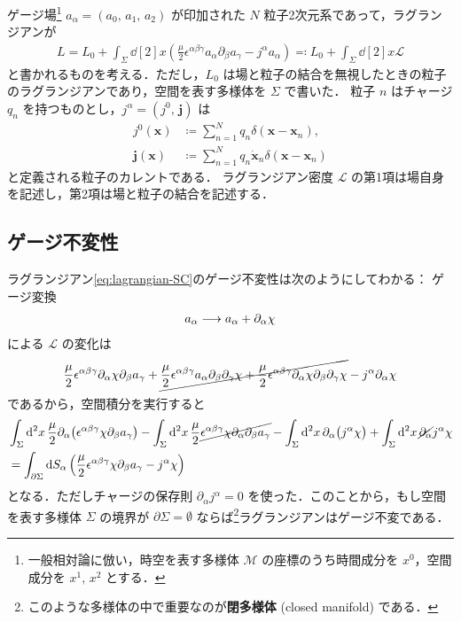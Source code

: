 \documentclass[TQFT_main]{subfiles}
\begin{document}
ゲージ場\footnote{一般相対論に倣い，時空を表す多様体 $\mathcal{M}$ の座標のうち時間成分を $x^0$，空間成分を $x^1,\, x^2$ とする．} $a_\alpha = (a_0,\, a_1,\, a_2)$ が印加された $N$ 粒子2次元系であって，ラグランジアンが
\begin{align}
    \label{eq:lagrangian-SC}
    L = L_0 + \int_\Sigma \dd[2]{x} \left( \frac{\mu}{2} \epsilon^{\alpha\beta\gamma} a_{\alpha} \partial_\beta a_\gamma -  j^\alpha a_\alpha \right) \eqqcolon L_0 + \int_{\Sigma} \dd[2]{x} \mathcal{L}
\end{align}
と書かれるものを考える．ただし，$L_0$ は場と粒子の結合を無視したときの粒子のラグランジアンであり，空間を表す多様体を $\Sigma$ で書いた．
粒子 $n$ はチャージ $q_n$ を持つものとし，$j^\alpha = (j^0,\, \bm{j})$ は
\begin{align}
    j^0(\bm{x}) &\coloneqq \sum_{n = 1}^N q_n \delta (\bm{x} - \bm{x}_n), \\
    \bm{j}(\bm{x}) &\coloneqq \sum_{n = 1}^N q_n \dot{\bm{x}}_n\delta (\bm{x} - \bm{x}_n)
\end{align}
と定義される粒子のカレントである．
ラグランジアン密度 $\mathcal{L}$ の第1項は場自身を記述し，第2項は場と粒子の結合を記述する．

\subsection{ゲージ不変性}

ラグランジアン\eqref{eq:lagrangian-SC}のゲージ不変性は次のようにしてわかる：
ゲージ変換
\begin{align}
    a_\alpha \longrightarrow a_\alpha + \partial_\alpha \chi
\end{align}
による $\mathcal{L}$ の変化は
\begin{align}
    \frac{\mu}{2} \epsilon^{\alpha\beta\gamma} \partial_{\alpha}\chi \partial_\beta a_\gamma + \cancel{\frac{\mu}{2} \epsilon^{\alpha\beta\gamma} a_\alpha\partial_\beta \partial_\gamma \chi + \frac{\mu}{2} \epsilon^{\alpha\beta\gamma} \partial_{\alpha}\chi \partial_\beta \partial_\gamma \chi} 
    -  j^\alpha \partial_\alpha \chi
\end{align}
であるから，空間積分を実行すると
\begin{align}
    &\int_{\Sigma} \dd[2]{x} \frac{\mu}{2} \partial_\alpha \bigl( \epsilon^{\alpha\beta\gamma} \chi \partial_\beta a_\gamma \bigr) - \int_{\Sigma} \dd[2]{x} \frac{\mu}{2} \cancel{\epsilon^{\alpha\beta\gamma} \chi \partial_\alpha\partial_\beta a_\gamma }
    - \int_{\Sigma} \dd[2]{x} \partial_\alpha \bigl( j^\alpha \chi \bigr) + \int_{\Sigma} \dd[2]{x} \cancel{\partial_\alpha} j^\alpha \chi \\
    &= \int_{\partial \Sigma} \dd S_\alpha \left(\frac{\mu}{2} \epsilon^{\alpha\beta\gamma} \chi \partial_\beta a_\gamma - j^\alpha \chi \right)
\end{align}
となる．ただしチャージの保存則 $\partial_\alpha j^\alpha = 0$ を使った．このことから，もし空間を表す多様体 $\Sigma$ の境界が $\partial \Sigma = \emptyset$ ならば\footnote{このような多様体の中で重要なのが\textbf{閉多様体} (closed manifold) である．}ラグランジアンはゲージ不変である．
\end{document}

